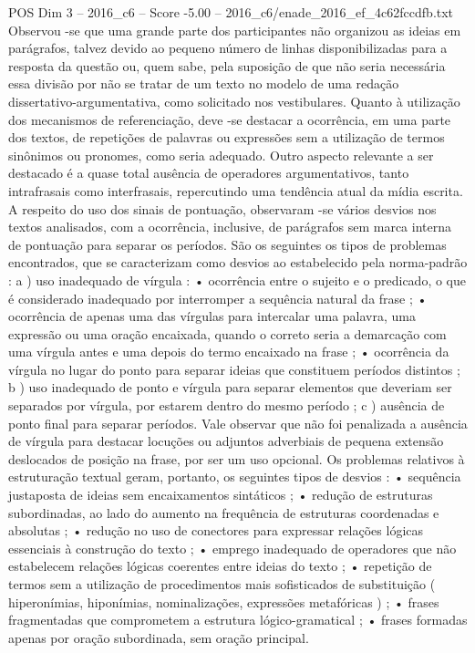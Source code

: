 \begin{textsample}{POS Dim 3 – 2016\_c6 – Score -5.00 – 2016\_c6/enade\_2016\_ef\_4c62fccdfb.txt}
Observou -se que uma grande parte dos participantes não organizou as ideias em parágrafos, talvez devido ao pequeno número de linhas disponibilizadas para a resposta da questão ou, quem sabe, pela suposição de que não seria necessária essa divisão por não se tratar de um texto no modelo de uma redação dissertativo-argumentativa, como solicitado nos vestibulares.
Quanto à utilização dos mecanismos de referenciação, deve -se destacar a ocorrência, em uma parte dos textos, de repetições de palavras ou expressões sem a utilização de termos sinônimos ou pronomes, como seria adequado.
Outro aspecto relevante a ser destacado é a quase total ausência de operadores argumentativos, tanto intrafrasais como interfrasais, repercutindo uma tendência atual da mídia escrita.
A respeito do uso dos sinais de pontuação, observaram -se vários desvios nos textos analisados, com a ocorrência, inclusive, de parágrafos sem marca interna de pontuação para separar os períodos.
São os seguintes os tipos de problemas encontrados, que se caracterizam como desvios ao estabelecido pela norma-padrão : a ) uso inadequado de vírgula : • ocorrência entre o sujeito e o predicado, o que é considerado inadequado por interromper a sequência natural da frase ; • ocorrência de apenas uma das vírgulas para intercalar uma palavra, uma expressão ou uma oração encaixada, quando o correto seria a demarcação com uma vírgula antes e uma depois do termo encaixado na frase ; • ocorrência da vírgula no lugar do ponto para separar ideias que constituem períodos distintos ; b ) uso inadequado de ponto e vírgula para separar elementos que deveriam ser separados por vírgula, por estarem dentro do mesmo período ; c ) ausência de ponto final para separar períodos.
Vale observar que não foi penalizada a ausência de vírgula para destacar locuções ou adjuntos adverbiais de pequena extensão deslocados de posição na frase, por ser um uso opcional.
Os problemas relativos à estruturação textual geram, portanto, os seguintes tipos de desvios : • sequência justaposta de ideias sem encaixamentos sintáticos ; • redução de estruturas subordinadas, ao lado do aumento na frequência de estruturas coordenadas e absolutas ; • redução no uso de conectores para expressar relações lógicas essenciais à construção do texto ; • emprego inadequado de operadores que não estabelecem relações lógicas coerentes entre ideias do texto ; • repetição de termos sem a utilização de procedimentos mais sofisticados de substituição ( hiperonímias, hiponímias, nominalizações, expressões metafóricas ) ; • frases fragmentadas que comprometem a estrutura lógico-gramatical ; • frases formadas apenas por oração subordinada, sem oração principal.

\end{textsample}
